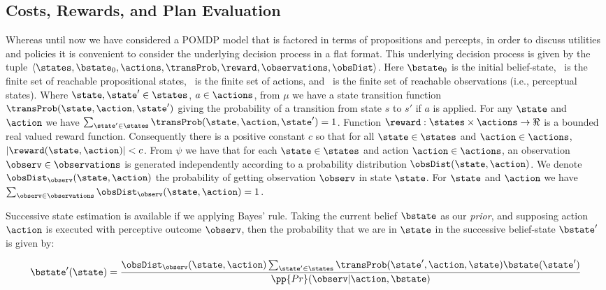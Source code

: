 \documentclass[letterpaper]{article}
\begin{document}
\subsection{Costs, Rewards, and Plan Evaluation}

Whereas until now we have considered a POMDP model that is factored in
terms of propositions and percepts, in order to discuss utilities and
policies it is convenient to consider the underlying decision process
in a flat format. This underlying decision process is given by the
tuple $\langle \states, \bstate_0, \actions, \transProb, \reward,
\observations, \obsDist \rangle$. Here $\bstate_0$ is the initial
belief-state, \states\ is the finite set of reachable propositional
states, \actions\ is the finite set of actions, and \observations\ is
the finite set of reachable observations (i.e., perceptual states).
Where $\state, \state' \in \states$, $a \in \actions$, from $\mu$ we
have a state transition function $\transProb(\state, \action,
\state')$ giving the probability of a transition from state $s$ to
$s'$ if $a$ is applied. For any $\state$ and $\action$ we have
$\sum_{\state' \in \states} \transProb(\state, \action, \state') = 1$.
Function $\reward:\states \times \actions \to \Re$ is a bounded real
valued reward function.  Consequently there is a positive constant $c$
so that for all $\state \in \states$ and $\action \in \actions$,
$|\reward(\state, \action)| < c$.
From $\psi$ we have that for each $\state \in \states$ and action
$\action \in \actions$, an observation $\observ \in \observations$ is
generated independently according to a probability distribution
$\obsDist(\state, \action)$. We denote $\obsDist_\observ(\state,
\action)$ the probability of getting observation $\observ$ in state
$\state$. For $\state$ and $\action$ we have $\sum_{\observ \in
\observations} \obsDist_\observ(\state, \action) = 1$.

Successive state estimation is available if we applying Bayes' rule.
Taking the current belief $\bstate$ as our {\em prior}, and supposing
action $\action$ is executed with perceptive outcome $\observ$, then
the probability that we are in $\state$ in the successive belief-state
$\bstate'$ is given by:

\begin{equation}\label{eq:revision}
\bstate'(\state) = \frac{\obsDist_\observ(\state, \action)
  \sum_{\state'\in \states} \transProb(\state', \action, \state) \bstate(\state') }{\pp{Pr}(\observ | \action, \bstate)}
\end{equation}
\end{document}

